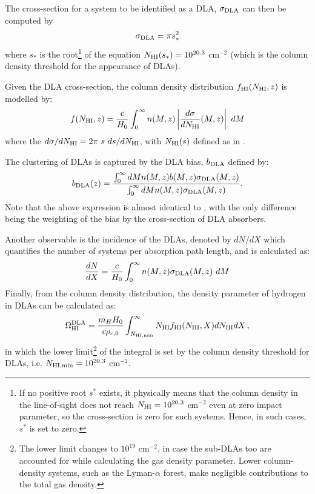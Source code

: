 The cross-section for a system to be identified as a DLA, $\sigma_{\rm DLA}$ can then be computed by 
\begin{equation}
    \sigma_{\rm DLA} = \pi s_*^2
\end{equation}
where $s_*$ is the root\footnote{If no positive root $s^*$ exists, it physically means that the column density in the line-of-sight does not reach $N_{\rm HI} = 10^{20.3}$ cm$^{-2}$ even at zero impact parameter, so the cross-section is zero for such systems. Hence, in such cases, $s ^{*}$ is set to zero.}  of the equation $N_{\rm HI}(s_*) = 10^{20.3}$ cm$^{-2}$ (which is the column density threshold for the appearance of DLAs). 

Given the DLA cross-section, 
the column density distribution $f_{\rm HI}(N_{\rm HI}, z)$ is modelled by:
\begin{equation}
 f(N_{\rm HI}, z) = \frac{c}{H_0} \int_0^{\infty} n(M,z) \left|\frac{d \sigma}{d N_{\rm HI}} (M,z) \right| \ dM 
 \label{coldensdef}
\end{equation} 
where the $d \sigma/d N_{\rm HI} =  2 \pi \ s \ ds/d N_{\rm HI}$, with $N_{\rm HI} (s)$ defined as in .

The clustering of DLAs is captured by the DLA bias, $b_{\rm DLA}$  defined by:
\begin{equation}
 b_{\rm DLA} (z) =  \frac{\int_{0}^{\infty} dM n (M,z) b(M,z) \sigma_{\rm DLA} (M,z)}{\int_{0}^{\infty} dM n (M,z) \sigma_{\rm DLA} (M,z)}.
 \label{bdla}
\end{equation} 
Note that the above expression is almost identical to , with the only difference being the weighting of the bias by the cross-section of DLA absorbers.

Another observable is the incidence of the DLAs, denoted by $dN/dX$ which quantifies the number of systems per absorption path length, and is calculated as:
\begin{equation}
 \frac{dN}{dX} = \frac{c}{H_0} \int_0^{\infty} n(M,z) \sigma_{\rm DLA}(M,z) \ dM
 \label{dndxdef}
\end{equation} 
Finally, from the column density distribution, the density parameter of hydrogen in DLAs can be calculated as:
\begin{equation}
 \Omega_{\rm HI}^{\rm DLA} = \frac{m_H H_0}{c \rho_{c,0}} \int_{N_{\rm HI, min}}^{\infty} N_{\rm HI} f_{\rm HI} (N_{\rm HI}, X) dN_{\rm HI} dX \, ,
\end{equation} 
in which the lower limit\footnote{The lower limit changes to $10^{19}$ cm$^{-2}$, \cite{zafar2013} in case the sub-DLAs too are accounted for while calculating the gas density parameter. Lower column-density systems, such as the Lyman-$\alpha$ forest,  make negligible contributions to the total gas density.} of the integral is set by the column density threshold for DLAs, i.e. $N_{\rm HI, min} = 10^{20.3}$ cm$^{-2}$. 



